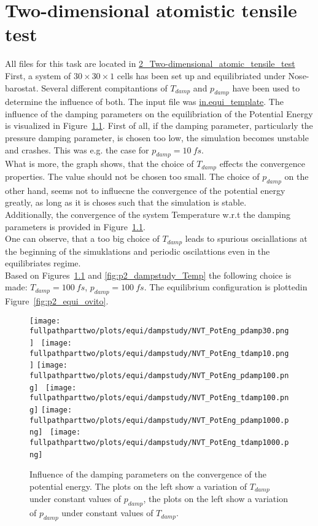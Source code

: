 \documentclass[10pt,a4paper]{report}
\def \pathparttwo {../../2_Two-dimensional_atomic_tensile_test}
\def \fullpathparttwo {/home/lukas/Desktop/project/independence/atomistic_modeling/exam/2_Two-dimensional_atomic_tensile_test}
\begin{document}
\FloatBarrier
\pagebreak
\chapter{Two-dimensional atomistic tensile test}
All files for this task are located in \href{\pathparttwo}{2\_Two-dimensional\_atomic\_tensile\_test}\\
First, a system of $30\times30\times1$ cells has been set up and equilibriated under Nose-barostat. Several different compitantions of $T_{damp}$ and $p_{damp}$ have been used to determine the influence of both. The input file was \href{\pathparttwo\in.equi_template}{in.equi\_template}.
The influence of the damping parameters on the equilibriation of the Potential Energy is visualized in Figure~\ref{fig:p2_dampstudy_PotEng}.
First of all, if the damping parameter, particularly the pressure damping parameter, is chosen too low, the simulation becomes unstable and crashes. This was e.g. the case for $p_{damp}=10~fs$.\\
What is more, the graph shows, that the choice of $T_{damp}$ effects the convergence properties. The value should not be chosen too small. The choice of $p_{damp}$ on the other hand, seems not to influecne the convergence of the potential energy greatly, as long as it is choses such that the simulation is stable.\\
Additionally, the convergence of the system Temperature w.r.t the damping parameters is provided in Figure~\ref{fig:p2_dampstudy_PotEng}.\\
One can observe, that a too big choice of $T_{damp}$ leads to spurious osciallations at the beginning of the simuklations and periodic oscilattions even in the equilibriates regime.\\

Based on Figures~\ref{fig:p2_dampstudy_PotEng} and \ref{fig:p2_dampstudy_Temp} the following choice is made: $T_{damp}=100~fs$, $p_{damp}=100~fs$.
The equilibrium configuration is plottedin Figure~\ref{fig:p2_equi_ovito}.

\begin{center}
\begin{figure}[h]
\texttt{[image: \\fullpathparttwo/plots/equi/dampstudy/NVT\_PotEng\_pdamp30.png]}~
\texttt{[image: \\fullpathparttwo/plots/equi/dampstudy/NVT\_PotEng\_tdamp10.png]}
\texttt{[image: \\fullpathparttwo/plots/equi/dampstudy/NVT\_PotEng\_pdamp100.png]}~
\texttt{[image: \\fullpathparttwo/plots/equi/dampstudy/NVT\_PotEng\_tdamp100.png]}
\texttt{[image: \\fullpathparttwo/plots/equi/dampstudy/NVT\_PotEng\_pdamp1000.png]}~
\texttt{[image: \\fullpathparttwo/plots/equi/dampstudy/NVT\_PotEng\_tdamp1000.png]}~
\caption[aaa]{Influence of the damping parameters on the convergence of the potential energy. The plots on the left show a variation of $T_{damp}$ under constant values of $p_{damp}$, the plots on the left show a variation of $p_{damp}$ under constant values of $T_{damp}$.}
\label{fig:p2_dampstudy_PotEng}
\end{figure}
\end{center}
\end{document}
